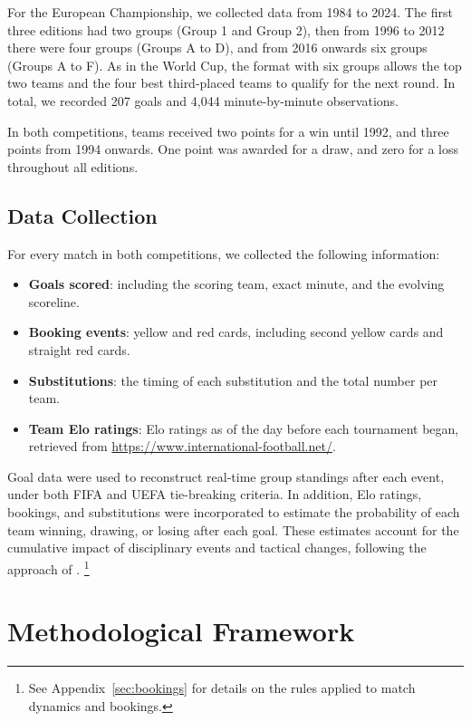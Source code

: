 \documentclass[11pt]{article}
\begin{document}
For the European Championship, we collected data from 1984 to 2024. The first three editions had two groups (Group 1 and Group 2), then from 1996 to 2012 there were four groups (Groups A to D), and from 2016 onwards six groups (Groups A to F). As in the World Cup, the format with six groups allows the top two teams and the four best third-placed teams to qualify for the next round. In total, we recorded 207 goals and 4,044 minute-by-minute observations.

In both competitions, teams received two points for a win until 1992, and three points from 1994 onwards. One point was awarded for a draw, and zero for a loss throughout all editions.


\subsection{Data Collection}

For every match in both competitions, we collected the following information:

\begin{itemize}
    \item \textbf{Goals scored}: including the scoring team, exact minute, and the evolving scoreline.
    \item \textbf{Booking events}: yellow and red cards, including second yellow cards and straight red cards.
    \item \textbf{Substitutions}: the timing of each substitution and the total number per team.
    \item \textbf{Team Elo ratings}: Elo ratings as of the day before each tournament began, retrieved from \url{https://www.international-football.net/}.
\end{itemize}

Goal data were used to reconstruct real-time group standings after each event, under both FIFA and UEFA tie-breaking criteria. In addition, Elo ratings, bookings, and substitutions were incorporated to estimate the probability of each team winning, drawing, or losing after each goal. These estimates account for the cumulative impact of disciplinary events and tactical changes, following the approach of \citet{titman2015joint}.
\footnote{See Appendix~\ref{sec:bookings} for details on the rules applied to match dynamics and bookings.}


\section{Methodological Framework}
\label{sec:estimation}
\end{document}
